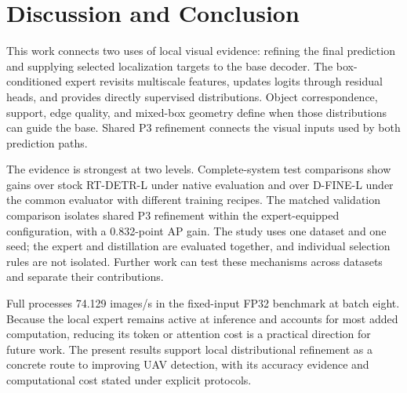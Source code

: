 \section{Discussion and Conclusion}
This work connects two uses of local visual evidence: refining the final prediction and supplying selected localization targets to the base decoder. The box-conditioned expert revisits multiscale features, updates logits through residual heads, and provides directly supervised distributions. Object correspondence, support, edge quality, and mixed-box geometry define when those distributions can guide the base. Shared P3 refinement connects the visual inputs used by both prediction paths.

The evidence is strongest at two levels. Complete-system test comparisons show gains over stock RT-DETR-L under native evaluation and over D-FINE-L under the common evaluator with different training recipes. The matched validation comparison isolates shared P3 refinement within the expert-equipped configuration, with a 0.832-point AP gain. The study uses one dataset and one seed; the expert and distillation are evaluated together, and individual selection rules are not isolated. Further work can test these mechanisms across datasets and separate their contributions.

Full processes 74.129 images/s in the fixed-input FP32 benchmark at batch eight. Because the local expert remains active at inference and accounts for most added computation, reducing its token or attention cost is a practical direction for future work. The present results support local distributional refinement as a concrete route to improving UAV detection, with its accuracy evidence and computational cost stated under explicit protocols.
